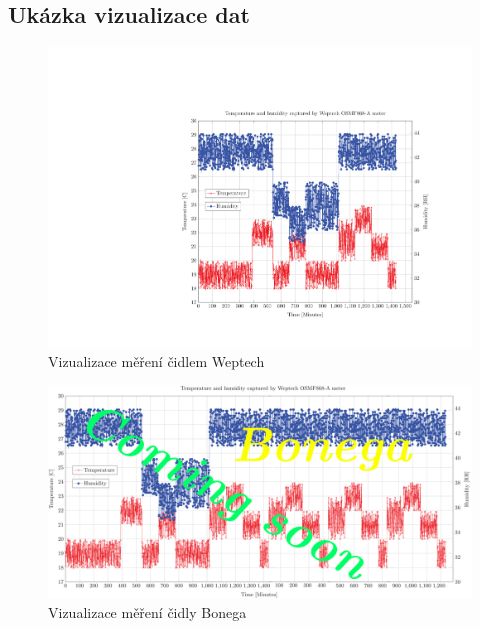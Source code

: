 \begin{landscape}
\chapter{Ukázka vizualizace dat}
\label{PrilohaGrafy}
	 \begin{figure}[!ht]
  \begin{center}
    \includegraphics[scale=1.8]{obrazky/chart_weptech}
  \end{center}
  \caption{Vizualizace měření čidlem Weptech}
	\label{GrafPriloha1}
\end{figure}
	 \begin{figure}[!ht]
  \begin{center}
    \includegraphics[scale=1.8]{obrazky/chart_bonega}
  \end{center}
  \caption{Vizualizace měření čidly Bonega}
	\label{GrafPriloha2}
\end{figure}

\end{landscape}
